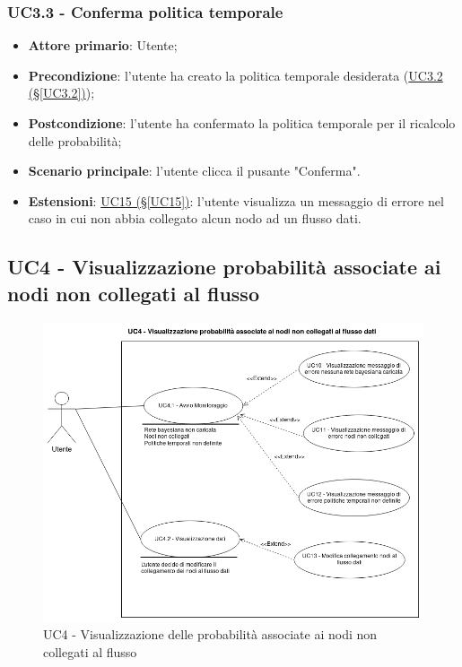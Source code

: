 \subsubsection{UC3.3 - Conferma politica temporale}\label{UC3.3}
\begin{itemize}
	\item \textbf{Attore primario}: Utente; 
	\item \textbf{Precondizione}: l'utente ha creato la politica temporale desiderata (\hyperref[UC3.2]{UC3.2 (§\ref*{UC3.2})});
	\item \textbf{Postcondizione}: l'utente ha confermato la politica temporale per il ricalcolo delle probabilità; 
	\item \textbf{Scenario principale}: l'utente clicca il pusante "Conferma".
	\item \textbf{Estensioni}: \hyperref[UC15]{UC15 (§\ref*{UC15})}: l'utente visualizza un messaggio di errore nel caso in cui non abbia collegato alcun nodo ad un flusso dati.
\end{itemize}

\newpage

\subsection{UC4 - Visualizzazione probabilità associate ai nodi non collegati al flusso}\label{UC4}

\begin{figure}[H]
\centering
\includegraphics[scale=0.4]{./images/UC4.png}
\caption{UC4 - Visualizzazione delle probabilità associate ai nodi non collegati al flusso}
\end{figure}

